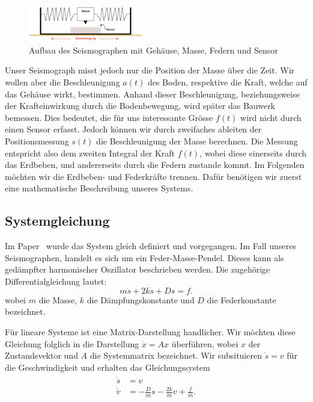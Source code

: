 \begin{figure}
 \begin{center}
 \includegraphics[width=5cm]{papers/erdbeben/Apperatur}
 \caption{Aufbau des Seismographen mit Gehäuse, Masse, Federn und Sensor}
 \label{erdbeben:Seismograph}
 \end{center}
\end{figure}

Unser Seismograph misst jedoch nur die Position der Masse über die Zeit. 
Wir wollen aber die Beschleunigung $a(t)$ des Boden,
respektive die Kraft,
welche auf das Gehäuse wirkt, bestimmen.  
Anhand dieser Beschleunigung,
beziehungsweise der Krafteinwirkung durch die Bodenbewegung,
wird später das Bauwerk bemessen.
Dies bedeutet, die für uns interessante Grösse $f(t)$ wird nicht durch einen Sensor erfasst. 
Jedoch können wir durch zweifaches ableiten der Positionsmessung $s(t)$ die Beschleunigung der Masse berechnen. 
Die Messung entspricht also dem zweiten Integral der Kraft $f(t)$,
wobei diese einerseits durch das Erdbeben, und andererseits durch die Federn zustande kommt.
Im Folgenden möchten wir die Erdbeben- und Federkräfte trennen.
Dafür benötigen wir zuerst eine mathematische Beschreibung unseres Systems.

\subsection{Systemgleichung}
Im Paper~\cite{erdbeben:mendezmueller} wurde das System gleich definiert und vorgegangen. 
Im Fall unseres Seismographen, handelt es sich um ein Feder-Masse-Pendel.
Dieses kann als gedämpfter harmonischer Oszillator beschrieben werden. 
Die zugehörige Differentialgleichung lautet:
\begin{equation}
	\label{erdbeben:Systemgleichung}
m\ddot s + 2k \dot s + Ds = f.
\end{equation}
wobei $m$ die Masse, $k$ die Dämpfungskonstante und $D$ die Federkonstante bezeichnet.

Für lineare Systeme ist eine Matrix-Darstellung handlicher.
Wir möchten diese Gleichung folglich in die Darstellung $\dot x = Ax$ überführen,
wobei $x$ der Zustandsvektor und $A$ die Systemmatrix bezeichnet.
Wir subsituieren $\dot s = v$ für die Geschwindigkeit und erhalten das Gleichungssystem
\begin{align}
  \begin{split}
    \dot s &= v \\ 
    \dot v &= -\frac{D}{m} {s} -\frac{2k}{m} {v} + \frac{f} {m}.
  \end{split}
  \label{erdbenen:systemgleichungen}
\end{align}

